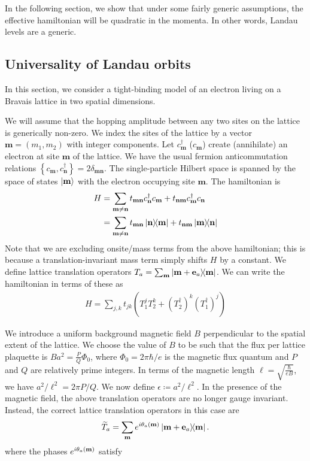 \documentclass[aps,prb,twocolumn,letterpaper,twoside,nobalancelastpage,groupedaddress,amsmath,amssymb,floatfix,citeautoscript]{revtex4-1}
\begin{document}
In the following section, we show that under some fairly generic assumptions, the effective hamiltonian will be quadratic in the momenta. In other words, Landau levels are a generic.


\subsection{Universality of Landau orbits}
In this section, we consider a tight-binding model of an electron living on a Bravais lattice in two spatial dimensions. 

We will assume that the hopping amplitude between any two sites on the lattice is generically non-zero. We index the sites of the lattice by a vector $\mathbf{m} = (m_1, m_2)$ with integer components. Let $c^{\dag}_{\mathbf{m}}$ ($c_{\mathbf{m}}$) create (annihilate) an electron at site $\mathbf{m}$ of the lattice. We have the usual fermion anticommutation relations $\left\{c_{\mathbf{m}},c_{\mathbf{n}}^{\dag}\right\} = 2\delta_{\mathbf{m} \mathbf{n}}$. The single-particle Hilbert space is spanned by the space of states $\ket{\mathbf{m}}$ with the electron occupying site $\mathbf{m}$. The hamiltonian is
\begin{align*}
H &= \sum_{\mathbf{m}\neq \mathbf{n}} t_{\mathbf{m}\mathbf{n}} c^{\dag}_\mathbf{n} c_\mathbf{m}  + t_{\mathbf{n}\mathbf{m}} c^{\dag}_{\mathbf{m}} c_{\mathbf{n}}\\  &= \sum_{\mathbf{m}\neq \mathbf{n}} t_{\mathbf{m}\mathbf{n}} \dyad{\mathbf{n}}{\mathbf{m}} + t_{\mathbf{n}\mathbf{m}} \dyad{\mathbf{m}}{\mathbf{n}}
\end{align*}
Note that we are excluding onsite/mass terms from the above hamiltonian; this is because a translation-invariant mass term simply shifts $H$ by a constant. We define lattice translation operators $T_a = \sum_{\bfm} \dyad{\mathbf{m} + \mathbf{e}_a}{\mathbf{m}}$. We can write the hamiltonian in terms of these as
\begin{align}
\label{eq-b0-lattice-hamiltonian}
H = \sum_{j,k} t_{jk} \left(T_1^j T_2^k + (T^{\dag}_2)^{k} (T^{\dag}_1)^{j}\right)
\end{align}

We introduce a uniform background magnetic field $B$ perpendicular to the spatial extent of the lattice. We choose the value of $B$ to be such that the flux per lattice plaquette is $Ba^2 = \frac{P}{Q}\Phi_0$, where $\Phi_0 = 2\pi \hbar /e$ is the magnetic flux quantum and $P$ and $Q$ are relatively prime integers. In terms of the magnetic length $\ell = \sqrt{\frac{\hbar}{eB}}$, we have $a^2/\ell^2 = 2 \pi P/Q$. We now define $\epsilon \coloneqq a^2/\ell^2$. In the presence of the magnetic field, the above translation operators are no longer gauge invariant. Instead, the correct lattice translation operators in this case are
\begin{align*}
\widetilde{T}_a = \sum_{\mathbf{m}} e^{i\theta_a(\mathbf{m})} \dyad{\bfm + \mathbf{e}_a}{\bfm}.
\end{align*}
where the phases $e^{i\theta_a(\mathbf{m})}$ satisfy 
\end{document}
